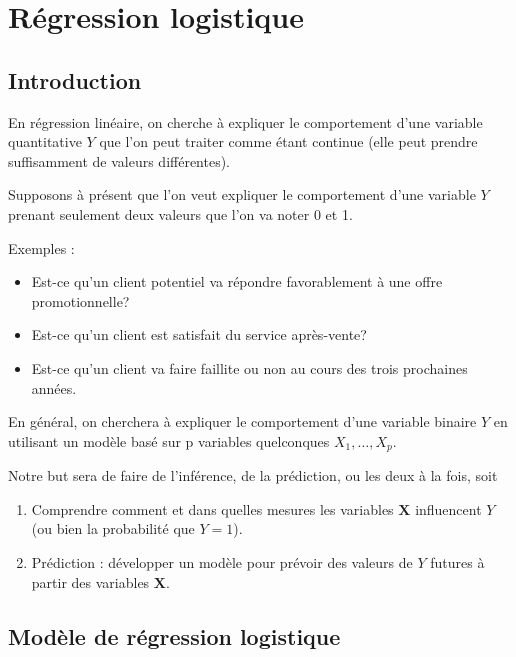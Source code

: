 \documentclass[
  11pt,
  letterpaper,
]{book}
\providecommand{\tightlist}{%
  \setlength{\itemsep}{0pt}\setlength{\parskip}{0pt}}
\theoremstyle{definition}
\theoremstyle{definition}
\theoremstyle{definition}
\theoremstyle{definition}
\theoremstyle{remark}
\begin{document}
\hypertarget{regression-logistique}{%
\chapter{Régression logistique}\label{regression-logistique}}

\hypertarget{introduction-4}{%
\section{Introduction}\label{introduction-4}}

En régression linéaire, on cherche à expliquer le comportement d'une variable quantitative \(Y\) que l'on peut traiter comme étant continue (elle peut prendre suffisamment de valeurs différentes).

Supposons à présent que l'on veut expliquer le comportement d'une variable \(Y\) prenant seulement deux valeurs que l'on va noter 0 et 1.

Exemples :

\begin{itemize}
\tightlist
\item
  Est-ce qu'un client potentiel va répondre favorablement à une offre promotionnelle?
\item
  Est-ce qu'un client est satisfait du service après-vente?
\item
  Est-ce qu'un client va faire faillite ou non au cours des trois prochaines années.
\end{itemize}

En général, on cherchera à expliquer le comportement d'une variable binaire \(Y\) en utilisant un modèle basé sur p variables quelconques \(X_1, \ldots, X_p\).

Notre but sera de faire de l'inférence, de la prédiction, ou les deux à la fois, soit

\begin{enumerate}
\def\labelenumi{\arabic{enumi})}
\tightlist
\item
  Comprendre comment et dans quelles mesures les variables \(\boldsymbol{X}\) influencent \(Y\) (ou bien la probabilité que \(Y=1\)).
\item
  Prédiction : développer un modèle pour prévoir des valeurs de \(Y\) futures à partir des variables \(\boldsymbol{X}\).
\end{enumerate}

\hypertarget{moduxe8le-de-ruxe9gression-logistique}{%
\section{Modèle de régression logistique}\label{moduxe8le-de-ruxe9gression-logistique}}
\end{document}
